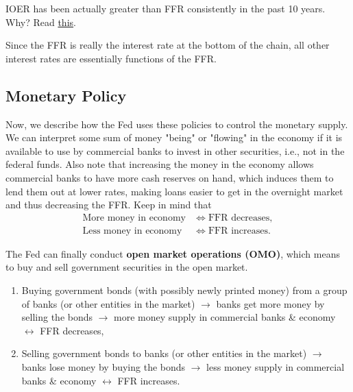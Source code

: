 \documentclass{article}
\begin{document}
    \begin{question}
      IOER has been actually greater than FFR consistently in the past 10 years. Why? Read \href{https://www.clevelandfed.org/publications/economic-commentary/2017/ec-201707-the-federal-funds-market-since-the-financial-crisis}{this}. 
    \end{question}

    Since the FFR is really the interest rate at the bottom of the chain, all other interest rates are essentially functions of the FFR.   

  \subsection{Monetary Policy}

    Now, we describe how the Fed uses these policies to control the monetary supply. We can interpret some sum of money "being" or "flowing" in the economy if it is available to use by commercial banks to invest in other securities, i.e., not in the federal funds. Also note that increasing the money in the economy allows commercial banks to have more cash reserves on hand, which induces them to lend them out at lower rates, making loans easier to get in the overnight market and thus decreasing the FFR. Keep in mind that
    \begin{align*} 
      \text{More money in economy} & \iff \text{FFR decreases}, \\
      \text{Less money in economy} & \iff \text{FFR increases}.
    \end{align*}

    \begin{definition}
      The Fed can finally conduct \textbf{open market operations (OMO)}, which means to buy and sell government securities in the open market.
      \begin{enumerate}
        \item Buying government bonds (with possibly newly printed money) from a group of banks (or other entities in the market) $\rightarrow$ banks get more money by selling the bonds $\rightarrow$ more money supply in commercial banks \& economy $\leftrightarrow$ FFR decreases,
        \item Selling government bonds to banks (or other entities in the market) $\rightarrow$ banks lose money by buying the bonds $\rightarrow$ less money supply in commercial banks \& economy $\leftrightarrow$ FFR increases.
      \end{enumerate}
    \end{definition}
\end{document}
